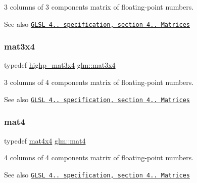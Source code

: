 3 columns of 3 components matrix of floating-\/point numbers.

\begin{DoxySeeAlso}{See also}
\href{http://www.opengl.org/registry/doc/GLSLangSpec.4.20.8.pdf}{\tt G\+L\+SL 4.. specification, section 4.. Matrices} 
\end{DoxySeeAlso}
\mbox{\label{group__core__types_ga5524ae15d7fc00a68b8e0e3a0733cc2a}} 
\subsubsection{\texorpdfstring{mat3x4}{mat3x4}}
{\footnotesize\ttfamily typedef \mbox{\hyperlink{group__core__precision_ga201566a8dbec6e27bec9e8e96ed4cdb6}{highp\+\_\+mat3x4}} \mbox{\hyperlink{group__core__types_ga5524ae15d7fc00a68b8e0e3a0733cc2a}{glm\+::mat3x4}}}

3 columns of 4 components matrix of floating-\/point numbers.

\begin{DoxySeeAlso}{See also}
\href{http://www.opengl.org/registry/doc/GLSLangSpec.4.20.8.pdf}{\tt G\+L\+SL 4.. specification, section 4.. Matrices} 
\end{DoxySeeAlso}
\mbox{\label{group__core__types_ga7dcd2365c2e368e6af5b7adeb6a9c8df}} 
\subsubsection{\texorpdfstring{mat4}{mat4}}
{\footnotesize\ttfamily typedef \mbox{\hyperlink{group__core__types_ga63e3ee9447ed593484140a9368e738ec}{mat4x4}} \mbox{\hyperlink{group__core__types_ga7dcd2365c2e368e6af5b7adeb6a9c8df}{glm\+::mat4}}}

4 columns of 4 components matrix of floating-\/point numbers.

\begin{DoxySeeAlso}{See also}
\href{http://www.opengl.org/registry/doc/GLSLangSpec.4.20.8.pdf}{\tt G\+L\+SL 4.. specification, section 4.. Matrices} 
\end{DoxySeeAlso}
\mbox{\label{group__core__types_ga72cf8ec4f4cda85943f4683531e421bc}} 
